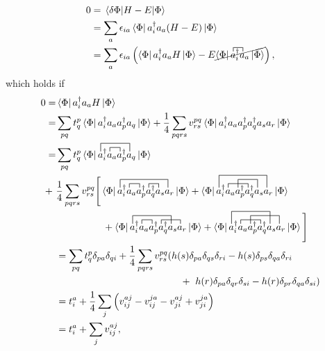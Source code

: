 \documentclass[Dual]{msu-thesis}
\begin{document}
\begin{align}
0
&=
\mel{\delta\Phi}{H-E}{\Phi}
\\
&=
\sum_a\epsilon_{ia}\bra{\Phi}a^\dagger_ia_a(H-E)\ket{\Phi}
\\
&=
\sum_a\epsilon_{ia}
\left(
\bra{\Phi}a^\dagger_ia_aH\ket{\Phi}
-
E\cancel{\bra{\Phi}
\contraction[1ex]{}{a}{^\dagger_i}{a}
a^\dagger_ia_a
\ket{\Phi}}
\right),
\end{align}
which holds if
\begin{align}
0
=&
\bra{\Phi}a^\dagger_ia_aH\ket{\Phi}
\\
=&
\sum_{pq}t^p_q
\bra{\Phi}a^\dagger_ia_aa^\dagger_pa_q\ket{\Phi}
+
\frac{1}{4}\sum_{pqrs}v^{pq}_{rs}
\bra{\Phi}a^\dagger_ia_aa^\dagger_pa^\dagger_qa_sa_r\ket{\Phi}
\\
=&
\sum_{pq}t^p_q
\bra{\Phi}
\contraction[2ex]{}{a}{^\dagger_ia_aa^\dagger_p}{a}
\contraction[1ex]{a^\dagger_i}{a}{_a}{a}
a^\dagger_ia_aa^\dagger_pa_q
\ket{\Phi}
\nonumber
\\
+\ &
\frac{1}{4}
\sum_{pqrs}v^{pq}_{rs}
\Bigg{[}
\bra{\Phi}
\contraction[2ex]{}{a}{^\dagger_ia_aa^\dagger_pa^\dagger_qa_s}{a}
\contraction[1ex]{a^\dagger_i}{a}{_a}{a}
\contraction[1ex]{a^\dagger_ia_aa^\dagger_p}{a}{^\dagger_q}{a}
a^\dagger_ia_aa^\dagger_pa^\dagger_qa_sa_r
\ket{\Phi}
+
\bra{\Phi}
\contraction[3ex]{}{a}{^\dagger_ia_aa^\dagger_pa^\dagger_qa_s}{a}
\contraction[1ex]{a^\dagger_i}{a}{_aa^\dagger_p}{a}
\contraction[2ex]{a^\dagger_ia_a}{a}{^\dagger_pa^\dagger_q}{a}
a^\dagger_ia_aa^\dagger_pa^\dagger_qa_sa_r
\ket{\Phi}
\nonumber
\\
& \hspace{17mm} +
\bra{\Phi}
\contraction[2ex]{}{a}{^\dagger_ia_aa^\dagger_pa^\dagger_q}{a}
\contraction[1ex]{a^\dagger_i}{a}{_a}{a}
\contraction[1ex]{a^\dagger_ia_aa^\dagger_p}{a}{^\dagger_qa_s}{a}
a^\dagger_ia_aa^\dagger_pa^\dagger_qa_sa_r
\ket{\Phi}
+
\bra{\Phi}
\contraction[3ex]{}{a}{^\dagger_ia_aa^\dagger_pa^\dagger_q}{a}
\contraction[1ex]{a^\dagger_i}{a}{_aa^\dagger_p}{a}
\contraction[2ex]{a^\dagger_ia_a}{a}{^\dagger_pa^\dagger_qa_s}{a}
a^\dagger_ia_aa^\dagger_pa^\dagger_qa_sa_r
\ket{\Phi}
\Bigg{]}
\\
&=
\sum_{pq}t^p_q\delta_{pa}\delta_{qi}
\nonumber
+
\frac{1}{4}\sum_{pqrs}v^{pq}_{rs}
(
h(s)\delta_{pa}\delta_{qs}\delta_{ri}
-
h(s)\delta_{ps}\delta_{qa}\delta_{ri}
\nonumber
\\
& \hspace{45mm} +\
h(r)\delta_{pa}\delta_{qr}\delta_{si}
-
h(r)\delta_{pr}\delta_{qa}\delta_{si}
)
\\
&=
t^a_i
+
\frac{1}{4}
\sum_j
\left(v^{aj}_{ij}-v^{ja}_{ij}-v^{aj}_{ji}+v^{ja}_{ji}\right)
\\
&=
t^a_i
+
\sum_jv^{aj}_{ij},
\end{align}
\end{document}
